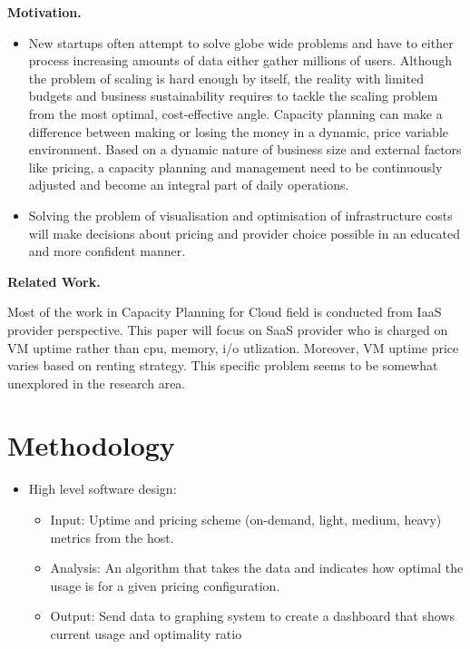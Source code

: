 \documentclass[11pt]{artikel3}
\begin{document}
{\bf Motivation.} 
\begin{itemize}
  \item New startups often attempt to solve globe wide problems and have to either process increasing amounts of data either gather millions of users. Although the problem of scaling is hard enough by itself, the reality with limited budgets and business sustainability requires to tackle the scaling problem from the most optimal, cost-effective angle. Capacity planning can make a difference between making or losing the money in a dynamic, price variable environment. Based on a dynamic nature of business size and external factors like pricing, a capacity planning and management need to be continuously adjusted and become an integral part of daily operations. 
  \item Solving the problem of visualisation and optimisation of infrastructure costs will make decisions about pricing and provider choice possible in an educated and more  confident manner. 
  
  
\end{itemize}








{\bf Related Work.}


Most of the work in Capacity Planning for Cloud field is conducted from IaaS provider perspective. This paper will focus on SaaS provider who is charged on VM uptime rather than cpu, memory, i/o utlization. Moreover, VM uptime price varies based on renting strategy. This specific problem seems to be somewhat unexplored in the research area.










\section{Methodology}








\begin{itemize}
\item High level software design:
  \begin{itemize}
   \item Input: Uptime and pricing scheme (on-demand, light, medium, heavy) metrics from the host.
   \item Analysis: An algorithm that takes the data and indicates how optimal the usage is for a given pricing configuration.
   \item Output: Send data to graphing system to create a dashboard that shows current usage and optimality ratio
  \end{itemize}
\end{itemize}
\end{document}
